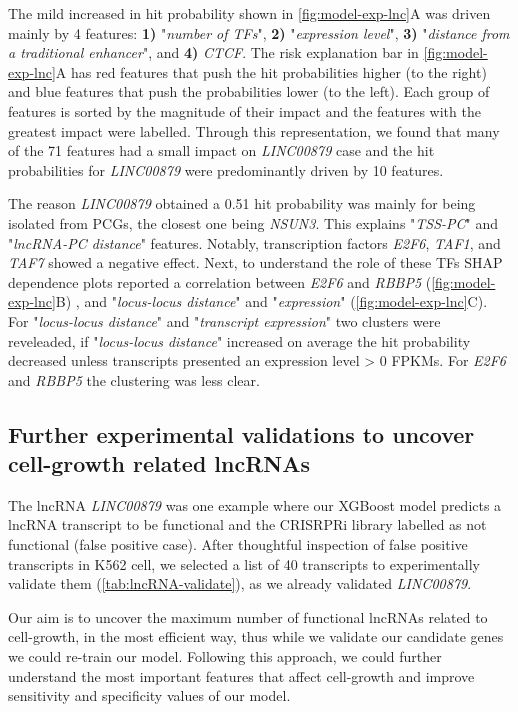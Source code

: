 The mild increased in hit probability shown in \autoref{fig:model-exp-lnc}A was driven mainly by 4 features: \textbf{1)} "\textit{number of TFs}", \textbf{2)} "\textit{expression level}", \textbf{3)} "\textit{distance from a traditional enhancer}", and \textbf{4)} \textit{CTCF}. The risk explanation bar in \autoref{fig:model-exp-lnc}A has red features that push the hit probabilities higher (to the right) and blue features that push the probabilities lower (to the left). Each group of features is sorted by the magnitude of their impact and the features with the greatest impact were labelled. Through this representation, we found that many of the 71 features had a small impact on \textit{LINC00879} case and the hit probabilities for \textit{LINC00879} were predominantly driven by 10 features. 

The reason \textit{LINC00879} obtained a 0.51 hit probability was mainly for being isolated from PCGs, the closest one being \textit{NSUN3}. This explains "\textit{TSS-PC}" and "\textit{lncRNA-PC distance}" features. Notably, transcription factors \textit{E2F6}, \textit{TAF1}, and \textit{TAF7} showed a negative effect. Next, to understand the role of these TFs SHAP dependence plots reported a correlation between \textit{E2F6} and \textit{RBBP5} (\autoref{fig:model-exp-lnc}B) , and "\textit{locus-locus distance}" and "\textit{expression}" (\autoref{fig:model-exp-lnc}C). For "\textit{locus-locus distance}" and "\textit{transcript expression}" two clusters were reveleaded, if "\textit{locus-locus distance}" increased on average the hit probability decreased unless transcripts presented an expression level > 0 FPKMs. For \textit{E2F6} and \textit{RBBP5} the clustering was less clear.  

\subsection{Further experimental validations to uncover cell-growth related lncRNAs}
\label{sec:list-lncRNA-validate}

The lncRNA \textit{LINC00879} was one example where our XGBoost model predicts a lncRNA transcript to be functional and the CRISRPRi library\autocite{liu_2017_crispri} labelled as not functional (false positive case). After thoughtful inspection of false positive transcripts in K562 cell, we selected a list of 40 transcripts to experimentally validate them (\autoref{tab:lncRNA-validate}), as we already validated \textit{LINC00879}.

Our aim is to uncover the maximum number of functional lncRNAs related to cell-growth, in the most efficient way, thus while we validate our candidate genes we could re-train our model. Following this approach, we could further understand the most important features that affect cell-growth and improve sensitivity and specificity values of our model. 


